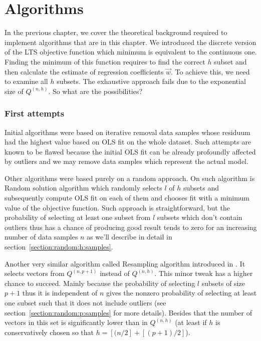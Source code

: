 \chapter{Algorithms}

In the previous chapter, we cover the theoretical background required to implement algorithms that are in this chapter. We introduced the discrete version of the LTS objective function which minimum is equivalent to the continuous one. Finding the minimum of this function requires to find the correct $h$ subset and then calculate the estimate of regression coefficients $\vec{w}$. To achieve this, we need to examine all $h$ subsets. The exhaustive approach fails due to the exponential size of $Q^{(n,h)}$. So what are the possibilities? 

\subsection{First attempts}
Initial algorithms were based on iterative removal data samples whose residuum had the highest value based on OLS fit on the whole dataset. Such attempts are known to be flawed \cite{hawkins:1994} because the initial OLS fit can be already profoundly affected by outliers and we may remove data samples which represent the actual model.

Other algorithms were based purely on a random approach. On such algorithm is Random solution algorithm \cite{bai2003random} which randomly selects $l$ of $h$ subsets and subsequently compute OLS fit on each of them and chooses fit with a minimum value of the objective function.  Such approach is straightforward, but the probability of selecting at least one subset from $l$ subsets which don't contain outliers thus has a chance of producing good result tends to zero for an increasing number of data samples $n$ as we'll describe in detail in section~\ref{section:random:h:samples}.

Another very similar algorithm called Resampling algorithm introduced in \cite{rousseeuw1987robust}. It selects vectors from $Q^{(n,p+1)}$ instead of $Q^{(n, h)}$. This minor tweak has a higher chance to succeed. Mainly because the probability of selecting $l$ subsets of size $p+1$ thus it is independent of $n$ gives the nonzero probability of selecting at least one subset such that it does not include outliers (see section~\ref{section:random:p:samples} for more details). Besides that the number of vectors in this set is significantly lower than in $Q^{(n, h)}$ (at least if $h$ is conservatively chosen so that $h = [(n/2] + [(p+1)/2]$).
 

